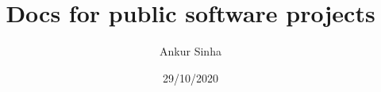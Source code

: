 
\usepackage{color}
\usepackage{tipa}
\usepackage[scale=2]{ccicons}
\usepackage{amssymb}
\usepackage{tikz}
\usetikzlibrary{mindmap, arrows.meta, positioning, arrows}
\usepackage{pgfplots}
\usepackage{jneurosci}
\usepackage{subcaption}
\usepackage[T1]{fontenc}
\usepackage[utf8]{inputenc}
% 
\usepackage[sfdefault]{roboto}
\usepackage[normalem]{ulem}
\usepackage{hyperref}
\hypersetup{colorlinks,linkcolor=Green,urlcolor=links}
\usepackage{graphicx}
\usepackage{algorithmic}
\usepackage{textcomp}
\usepackage{wrapfig}
\usepackage{textgreek}
\usepackage{euler}
\usepackage{tabularx}
\usepackage{booktabs}
\usepackage{minted}
\usepackage{csquotes}


\renewcommand{\footnoterule}{}

\title{Docs for public software projects}
\author[Ankur Sinha]{Ankur Sinha}
\date{29/10/2020}




\begin{frame}
  \titlepage{}
\end{frame}
